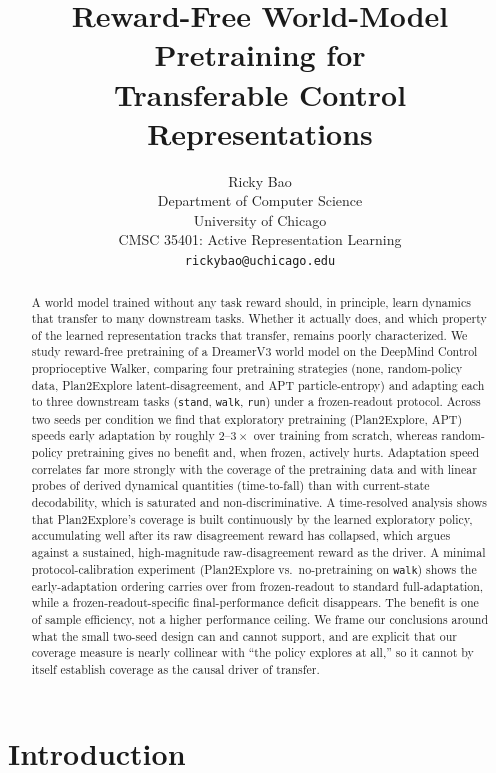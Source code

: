 \documentclass{article}
\title{Reward-Free World-Model Pretraining for \\ Transferable Control Representations}
\author{Ricky Bao \\
Department of Computer Science \\
University of Chicago \\
CMSC 35401: Active Representation Learning \\
\texttt{rickybao@uchicago.edu}}
\begin{document}
\maketitle
\lhead{}
\renewcommand{\headrulewidth}{0pt}

\begin{abstract}
A world model trained without any task reward should, in principle, learn
dynamics that transfer to many downstream tasks. Whether it actually does, and
which property of the learned representation tracks that transfer,
remains poorly characterized. We study reward-free pretraining of a DreamerV3
world model on the DeepMind Control proprioceptive Walker, comparing four
pretraining strategies (none, random-policy data, Plan2Explore
latent-disagreement, and APT particle-entropy) and adapting each to three
downstream tasks (\texttt{stand}, \texttt{walk}, \texttt{run}) under a
frozen-readout protocol. Across two seeds per condition we find that
exploratory pretraining (Plan2Explore, APT) speeds early adaptation by roughly
$2$--$3\times$ over training from scratch, whereas random-policy pretraining
gives no benefit and, when frozen, actively hurts. Adaptation speed correlates
far more strongly with the coverage of the pretraining data and with
linear probes of derived dynamical quantities (time-to-fall) than with
current-state decodability, which is saturated and non-discriminative. A
time-resolved analysis shows that Plan2Explore's coverage is built
continuously by the learned exploratory policy, accumulating well after
its raw disagreement reward has collapsed, which argues against a sustained,
high-magnitude raw-disagreement reward as the driver. A minimal
protocol-calibration experiment (Plan2Explore vs.\ no-pretraining on
\texttt{walk}) shows the early-adaptation ordering carries over from
frozen-readout to standard full-adaptation, while a frozen-readout-specific
final-performance deficit disappears. The benefit is one of sample
efficiency, not a higher performance ceiling. We frame our conclusions around
what the small two-seed design can and cannot support, and are explicit that our
coverage measure is nearly collinear with ``the policy explores at all,'' so it
cannot by itself establish coverage as the causal driver of transfer.
\end{abstract}

\section{Introduction}
\end{document}
